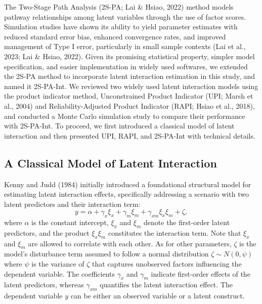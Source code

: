 \documentclass[
  man]{apa6}
\begin{document}
The Two-Stage Path Analysis (2S-PA; Lai \& Hsiao, 2022) method models pathway relationships among latent variables through the use of factor scores. Simulation studies have shown its ability to yield parameter estimates with reduced standard error bias, enhanced convergence rates, and improved management of Type I error, particularly in small sample contexts (Lai et al., 2023; Lai \& Hsiao, 2022). Given its promising statistical property, simpler model specification, and easier implementation in widely used softwares, we extended the 2S-PA method to incorporate latent interaction estimation in this study, and named it 2S-PA-Int. We reviewed two widely used latent interaction models using the product indicator method, Unconstrained Product Indicator (UPI; Marsh et al., 2004) and Reliability-Adjusted Product Indicator (RAPI; Hsiao et al., 2018), and conducted a Monte Carlo simulation study to compare their performance with 2S-PA-Int. To proceed, we first introduced a classical model of latent interaction and then presented UPI, RAPI, and 2S-PA-Int with technical details.

\subsection{A Classical Model of Latent Interaction}\label{a-classical-model-of-latent-interaction}

Kenny and Judd (1984) initially introduced a foundational structural model for estimating latent interaction effects, specifically addressing a scenario with two latent predictors and their interaction term:
\begin{equation}
y = \alpha + \gamma_{x}\xi_{x} + \gamma_{m}\xi_{m} + \gamma_{xm}\xi_{x}\xi_{m} + \zeta,
\end{equation}
where \(\alpha\) is the constant intercept, \(\xi_{x}\) and \(\xi_{m}\) denote the first-order latent predictors, and the product \(\xi_{x}\xi_{m}\) constitutes the interaction term. Note that \(\xi_{x}\) and \(\xi_{m}\) are allowed to correlate with each other. As for other parameters, \(\zeta\) is the model's disturbance term assumed to follow a normal distribution \(\zeta \sim N(0, \psi)\) where \(\psi\) is the variance of \(\zeta\) that captures unobserved factors influencing the dependent variable. The coefficients \(\gamma_{x}\) and \(\gamma_{m}\) indicate first-order effects of the latent predictors, whereas \(\gamma_{xm}\) quantifies the latent interaction effect. The dependent variable \(y\) can be either an observed variable or a latent construct.
\end{document}
